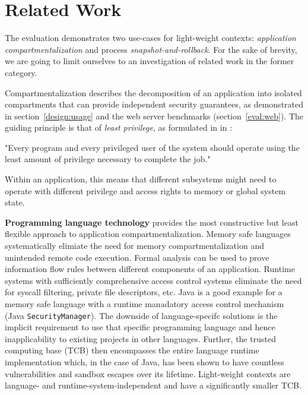 \documentclass[10pt,twocolumn,letter]{article}
\begin{document}
\section{Related Work}\label{rel}
The evaluation demonstrates two use-cases for light-weight contexts: \textit{application compartmentalization} and process \textit{snapshot-and-rollback}.
For the sake of brevity, we are going to limit ourselves to an investigation of related work in the former category.

Compartmentalization describes the decomposition of an application into isolated compartments that can provide independent security guarantees, as demonstrated in section~\ref{design:usage} and the web server benchmarks (section~\ref{eval:web}).
The guiding principle is that of \textit{least privilege}, as formulated in \citeyear{principleofleastprivilege} in \cite{principleofleastprivilege}:~%
\begin{displayquote}
"Every program and every privileged user of the system should operate using the least amount of privilege necessary to complete the job."
\end{displayquote}
Within an application, this means that different subsystems might need to operate with different privilege and access rights to memory or global system state.

\textbf{Programming language technology} provides the most constructive but least flexible approach to application compartmentalization.
Memory safe languages systematically elimiate the need for memory compartmentalization and unintended remote code execution.
Formal analysis can be used to prove information flow rules between different components of an application.
Runtime systems with sufficiently comprehensive access control systems eliminate the need for syscall filtering, private file descriptors, etc.
Java is a good example for a memory safe language with a runtime manadatory access control mechanism (Java \lstinline{SecurityManager}).
The downside of language-specifc solutions is the implicit requirement to use that specific programming language and hence inapplicability to existing projects in other languages.
Further, the trusted computing base (TCB) then encompasses the entire language runtime implementation which, in the case of Java, has been shown to have countless vulnerabilities and sandbox escapes over its lifetime.
Light-weight contexts are language- and runtime-system-independent and have a significantly smaller TCB.
\cite{javasecurity,bartel2018twentyyearsjavasecuritysandboxescape}
\end{document}
